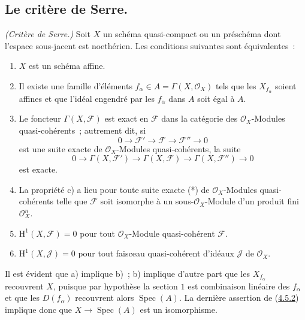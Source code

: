 
\subsection{Le critère de Serre.}
\label{subsection:II.5.2-fr}

\begin{theorem}[5.2.1]
\label{II.5.2.1-fr}
\emph{(Critère de Serre.)} Soit $X$ un schéma quasi-compact ou un préschéma
dont l'espace sous-jacent est noethérien. Les conditions suivantes sont
équivalentes~:
\begin{enumerate}
  \item[\rm{a)}] $X$ est un schéma affine.
  \item[\rm{b)}] Il existe une famille d'éléments
  $f_\alpha\in A=\Gamma(X,\mathcal{O}_X)$ tels que les $X_{f_\alpha}$ soient
  affines et que l'idéal engendré par les $f_\alpha$ dans $A$ soit égal à
  $A$.
  \item[\rm{c)}] Le foncteur $\Gamma(X,\mathcal{F})$ est exact en
  $\mathcal{F}$ dans la catégorie des $\mathcal{O}_X$-Modules
  quasi-cohérents~; autrement dit, si
  \[
    0\to\mathcal{F}'\to\mathcal{F}\to\mathcal{F}''\to0 \tag{*}
  \]
  est une suite exacte de $\mathcal{O}_X$-Modules quasi-cohérents, la suite
  \[
    0\to\Gamma(X,\mathcal{F}')\to\Gamma(X,\mathcal{F})
      \to\Gamma(X,\mathcal{F}'')\to0
  \]
  est exacte.
  \item[\rm{c')}] La propriété c) a lieu pour toute suite exacte (*) de
  $\mathcal{O}_X$-Modules quasi-cohérents telle que $\mathcal{F}$ soit
  isomorphe à un sous-$\mathcal{O}_X$-Module d'un produit fini
  $\mathcal{O}_X^n$.
  \item[\rm{d)}] $\mathrm{H}^1(X,\mathcal{F})=0$ pour tout
  $\mathcal{O}_X$-Module quasi-cohérent $\mathcal{F}$.
  \item[\rm{d')}] $\mathrm{H}^1(X,\mathcal{J})=0$ pour tout faisceau
  quasi-cohérent d'idéaux $\mathcal{J}$ de $\mathcal{O}_X$.
\end{enumerate}
\end{theorem}

Il est évident que a) implique b)~; b) implique d'autre part que les
$X_{f_\alpha}$ recouvrent $X$, puisque par hypothèse la section $1$ est
combinaison linéaire des $f_\alpha$ et que les $D(f_\alpha)$ recouvrent
alors $\operatorname{Spec}(A)$. La dernière assertion de
(\hyperref[II.4.5.2-fr]{4.5.2}) implique donc que
$X\to\operatorname{Spec}(A)$ est un isomorphisme.

